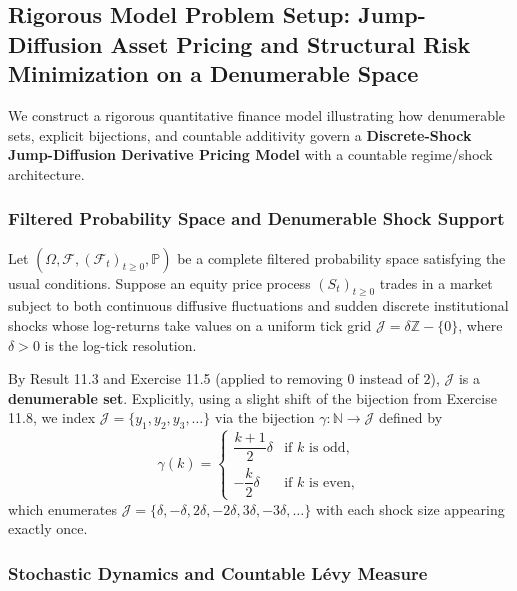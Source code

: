 \documentclass[11pt, letterpaper]{article}
\theoremstyle{definition}
\theoremstyle{remark}
\begin{document}
\subsection{Rigorous Model Problem Setup: Jump-Diffusion Asset Pricing and Structural Risk Minimization on a Denumerable Space}

We construct a rigorous quantitative finance model illustrating how denumerable sets, explicit bijections, and countable additivity govern a \textbf{Discrete-Shock Jump-Diffusion Derivative Pricing Model} with a countable regime/shock architecture.

\subsubsection{Filtered Probability Space and Denumerable Shock Support}

Let $(\Omega, \mathcal{F}, (\mathcal{F}_t)_{t \ge 0}, \mathbb{P})$ be a complete filtered probability space satisfying the usual conditions. Suppose an equity price process $(S_t)_{t \ge 0}$ trades in a market subject to both continuous diffusive fluctuations and sudden discrete institutional shocks whose log-returns take values on a uniform tick grid $\mathcal{J} = \delta \mathbb{Z} - \{0\}$, where $\delta > 0$ is the log-tick resolution.

By Result 11.3 and Exercise 11.5 (applied to removing $0$ instead of $2$), $\mathcal{J}$ is a \textbf{denumerable set}. Explicitly, using a slight shift of the bijection from Exercise 11.8, we index $\mathcal{J} = \{y_1, y_2, y_3, \dots\}$ via the bijection $\gamma : \mathbb{N} \to \mathcal{J}$ defined by
\[
\gamma(k) = \begin{cases}
\dfrac{k + 1}{2}\delta & \text{if } k \text{ is odd}, \\[6pt]
-\dfrac{k}{2}\delta & \text{if } k \text{ is even},
\end{cases}
\]
which enumerates $\mathcal{J} = \{\delta, -\delta, 2\delta, -2\delta, 3\delta, -3\delta, \dots\}$ with each shock size appearing exactly once.

\subsubsection{Stochastic Dynamics and Countable L\'evy Measure}
\end{document}
